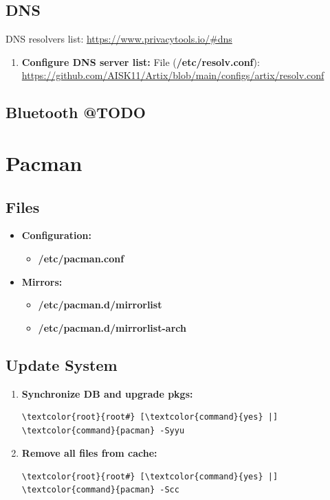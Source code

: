 \documentclass[10pt, a4paper, onecolumn, oneside, titlepage, openany]{book}
\begin{document}
\section{DNS}
DNS resolvers list: \url{https://www.privacytools.io/#dns}
\begin{enumerate}
    \item \textbf{Configure DNS server list:}
\newline File (\textbf{\textcolor{file}{/etc/resolv.conf}}):
\newline \url{https://github.com/AISK11/Artix/blob/main/configs/artix/resolv.conf}
\end{enumerate}

\section{Bluetooth @TODO}


\chapter{Pacman}
\section{Files}
\begin{itemize}
    \item \textbf{Configuration:}
    \begin{itemize}
        \item \textbf{\textcolor{file}{/etc/pacman.conf}}
    \end{itemize}
    \item \textbf{Mirrors:}
    \begin{itemize}
        \item \textbf{\textcolor{file}{/etc/pacman.d/mirrorlist}} 
        \item \textbf{\textcolor{file}{/etc/pacman.d/mirrorlist-arch}}
    \end{itemize}
\end{itemize}
\section{Update System}
\begin{enumerate}
    \item \textbf{Synchronize DB and upgrade pkgs:}
\begin{Verbatim}[commandchars=\\\{\}]
\textcolor{root}{root#} [\textcolor{command}{yes} |] \textcolor{command}{pacman} -Syyu
\end{Verbatim}
    \item \textbf{Remove all files from cache:}
\begin{Verbatim}[commandchars=\\\{\}]
\textcolor{root}{root#} [\textcolor{command}{yes} |] \textcolor{command}{pacman} -Scc
\end{Verbatim}
\end{enumerate}
\end{document}
